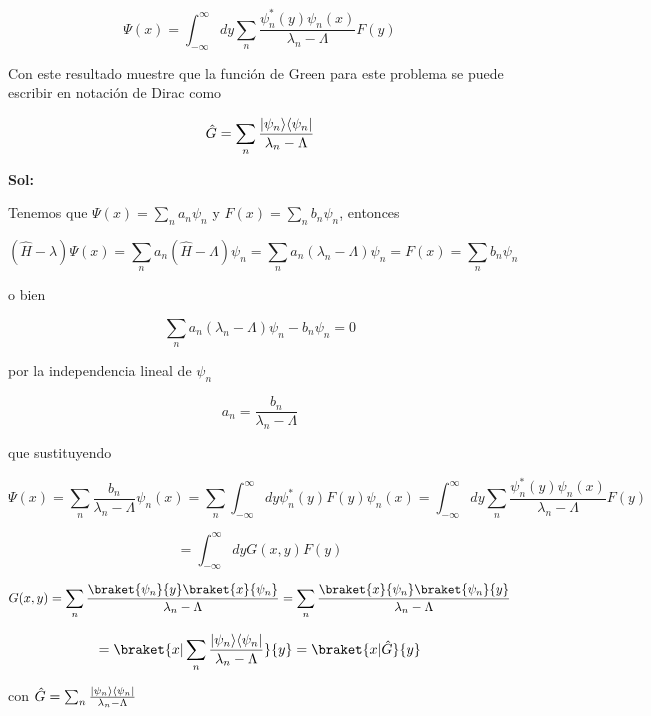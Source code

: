 \documentclass[12pt,a4paper]{article}
\DeclarePairedDelimiter\bra{\langle}{\rvert}
\DeclarePairedDelimiter\ket{\lvert}{\rangle}
\begin{document}
\begin{enumerate}
\begin{equation*}
    \Psi (x) = \int_{-\infty}^{\infty} dy \sum_{n} \frac{\psi_{n}^{*}(y)\psi_{n}(x)}{\lambda_{n} - \Lambda} F(y)
\end{equation*}

Con este resultado muestre que la función de Green para este problema se puede escribir en notación de Dirac como

\begin{equation*}
    \hat{G} = \sum_{n} \frac{\ket{\psi_n}\bra{\psi_n}}{\lambda_n - \Lambda}
\end{equation*}

\textbf{Sol:}

Tenemos que $\Psi (x) = \sum_{n} a_n \psi_{n} $ y $F(x) = \sum_{n} b_{n} \psi_{n}$, entonces

\begin{equation*}
    (\hat{H} - \lambda) \Psi (x) = \sum_{n} a_n (\hat{H}- \Lambda) \psi_{n} = \sum_{n} a_{n} (\lambda_{n} - \Lambda) \psi_{n} = F(x) = \sum_{n} b_{n} \psi_{n}
\end{equation*}

o bien

\begin{equation*}
    \sum_{n} a_{n} (\lambda_{n} - \Lambda) \psi_{n} - b_{n} \psi_{n} = 0
\end{equation*}

por la independencia lineal de $\psi_{n}$

\begin{equation*}
    a_{n} = \frac{b_{n}}{\lambda_{n} - \Lambda}
\end{equation*}

que sustituyendo

\begin{equation*}
    \Psi (x) = \sum_{n} \frac{b_{n}}{\lambda_n - \Lambda} \psi_n (x) = \sum_{n} \int_{-\infty}^{\infty} dy \psi_{n}^{*} (y) F(y) \psi_{n} (x) = \int_{-\infty}^{\infty} dy  \sum_{n} \frac{\psi_{n}^{*}(y)\psi_{n} (x)}{\lambda_{n} - \Lambda} F(y)
\end{equation*}

\begin{equation*}
    = \int_{-\infty}^{\infty} dy G(x,y) F(y)
\end{equation*}

\begin{equation*}
    G(x,y) = \sum_{n} \frac{\braket{\psi_{n}}{y}\braket{x}{\psi_{n}}}{\lambda_n - \Lambda} = \sum_{n} \frac{\braket{x}{\psi_{n}}\braket{\psi_{n}}{y}}{\lambda_{n} - \Lambda}
\end{equation*}

\begin{equation*}
    = \braket{x|\sum_{n} \frac{\ket{\psi_{n}}\bra{\psi_n}}{\lambda_n - \Lambda}}{y} = \braket{x|\hat{G}}{y}
\end{equation*}

con $\hat{G} = \sum_{n} \frac{\ket{\psi_{n}}\bra{\psi_{n}}}{\lambda_n - \Lambda}$
    
    
\end{enumerate}
\end{document}
